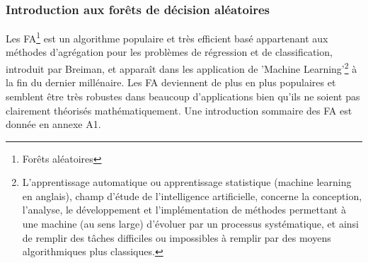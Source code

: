 	\subsubsection{Introduction aux forêts de décision aléatoires}
	Les FA\footnote{Forêts aléatoires} est un algorithme populaire et très efficient basé appartenant aux méthodes d'agrégation pour les problèmes de régression et de classification, introduit par Breiman\cite{BREI01}, et apparaît dans les application de 'Machine Learning'\footnote{L'apprentissage automatique ou apprentissage statistique (machine learning en anglais), champ d'étude de l'intelligence artificielle, concerne la conception, l'analyse, le développement et l'implémentation de méthodes permettant à une machine (au sens large) d'évoluer par un processus systématique, et ainsi de remplir des tâches difficiles ou impossibles à remplir par des moyens algorithmiques plus classiques.} à la fin du dernier millénaire\cite{DITRI99}. Les FA deviennent de plus en plus populaires et semblent être très robustes dans beaucoup d'applications bien qu'ils ne soient pas clairement théorisés mathématiquement\cite{BIA08}. Une introduction sommaire des FA est donnée en annexe A1.
	\par

